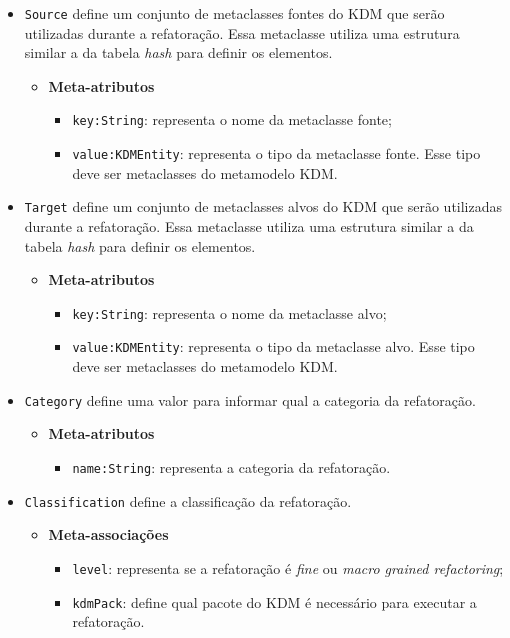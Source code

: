 \begin{itemize}
\item \texttt{Source} define um conjunto de metaclasses fontes do KDM que serão utilizadas durante a refatoração. Essa metaclasse utiliza uma estrutura similar a da tabela \textit{hash} para definir os elementos.

\begin{itemize}
	\item \textbf{Meta-atributos}
		\begin{itemize}
			\item \texttt{key:String}: representa o nome da metaclasse fonte;
			\item \texttt{value:KDMEntity}: representa o tipo da metaclasse fonte. Esse tipo deve ser metaclasses do metamodelo KDM.
		\end{itemize}	
\end{itemize}

\item \texttt{Target} define um conjunto de metaclasses alvos do KDM que serão utilizadas durante a refatoração. Essa metaclasse utiliza uma estrutura similar a da tabela \textit{hash} para definir os elementos.

\begin{itemize}
	\item \textbf{Meta-atributos}
		\begin{itemize}
			\item \texttt{key:String}: representa o nome da metaclasse alvo;
			\item \texttt{value:KDMEntity}: representa o tipo da metaclasse alvo. Esse tipo deve ser metaclasses do metamodelo KDM.
		\end{itemize}	
\end{itemize}

\item \texttt{Category} define uma valor para informar qual a categoria da refatoração.

\begin{itemize}
	\item \textbf{Meta-atributos}
		\begin{itemize}
			\item \texttt{name:String}: representa a categoria da refatoração.
		\end{itemize}	
\end{itemize}

\item \texttt{Classification} define a classificação da refatoração.

\begin{itemize}
	\item \textbf{Meta-associações}
		\begin{itemize}
			\item \texttt{level}: representa se a refatoração é \textit{fine} ou \textit{macro grained refactoring};
			\item \texttt{kdmPack}: define qual pacote do KDM é necessário para executar a refatoração.
		\end{itemize}	
\end{itemize} 


\end{itemize}
